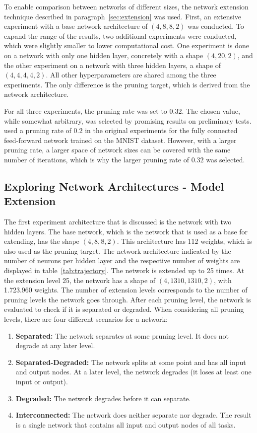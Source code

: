 To enable comparison between networks of different sizes, the network extension technique described in paragraph~\ref{sec:extension} was used.
First, an extensive experiment with a base network architecture of $(4,8,8,2)$ was conducted.
To expand the range of the results, two additional experiments were conducted, which were slightly smaller to lower computational cost.
One experiment is done on a network with only one hidden layer, concretely with a shape $(4,20,2)$, and the other experiment on a network with three hidden layers, a shape of $(4,4,4,4,2)$.
All other hyperparameters are shared among the three experiments.
The only difference is the pruning target, which is derived from the network architecture.

For all three experiments, the pruning rate was set to $0.32$.
The chosen value, while somewhat arbitrary, was selected by promising results on preliminary tests.
\textcite{LTH} used a pruning rate of $0.2$ in the original experiments for the fully connected feed-forward network trained on the MNIST dataset.
However, with a larger pruning rate, a larger space of network sizes can be covered with the same number of iterations, which is why the larger pruning rate of $0.32$ was selected.


\subsection{Exploring Network Architectures - Model Extension}\label{two-hidden}
The first experiment architecture that is discussed is the network with two hidden layers.
The base network, which is the network that is used as a base for extending, has the shape $(4,8,8,2)$.
This architecture has 112 weights, which is also used as the pruning target.
The network architecture indicated by the number of neurons per hidden layer and the respective number of weights are displayed in table~\ref{tab:trajectory}.
The network is extended up to 25 times.
At the extension level 25, the network has a shape of $(4,1310,1310,2)$, with 1.723.960 weights.
The number of extension levels corresponds to the number of pruning levels the network goes through.
After each pruning level, the network is evaluated to check if it is separated or degraded.
When considering all pruning levels, there are four different scenarios for a network:

\begin{enumerate}
\item \textbf{Separated:}
The network separates at some pruning level. 
It does not degrade at any later level. 
\item \textbf{Separated-Degraded:} 
The network splits at some point and has all input and output nodes.
At a later level, the network degrades (it loses at least one input or output).
\item \textbf{Degraded:} 
The network degrades before it can separate.
\item \textbf{Interconnected:} 
The network does neither separate nor degrade. 
The result is a single network that contains all input and output nodes of all tasks.
\end{enumerate}

